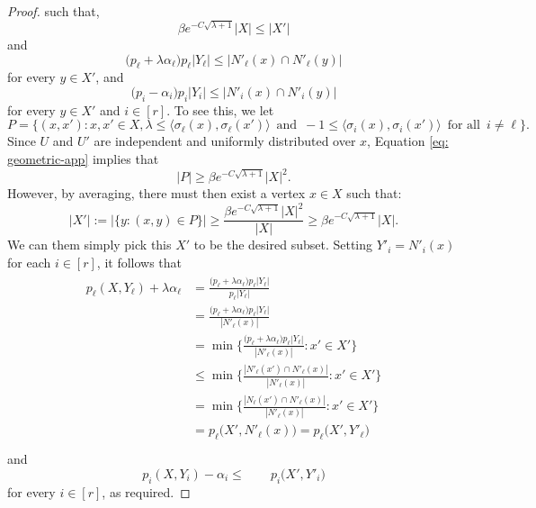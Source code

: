 \begin{proof}
  such that,
  \begin{equation*}
    \beta e^{- C \sqrt{\lambda + 1}} |X| \le |X'|
  \end{equation*}
  and
  \begin{equation*}
    \big( p_\ell + \lambda\alpha_\ell \big) p_\ell |Y_\ell | \le |N'_\ell(x) \cap N'_\ell(y)|
  \end{equation*}
  for every \(y \in X'\), and
  \begin{equation*}
    \big( p_i - \alpha_i \big) p_i |Y_i| \le |N'_i(x) \cap N'_i(y)|
  \end{equation*}
  for every \(y \in X'\) and \(i \in [r]\). To see this, we let 
  \begin{equation*}
     P= \Biggl\{(x,x'): x,x' \in X , \lambda  \le \big\langle \sigma_\ell(x),\sigma_\ell(x') \big\rangle \, \text{ and } \, -1 \le \big\langle \sigma_i(x), \sigma_i(x') \big\rangle \, \text{ for all } \, i \ne \ell  \Biggr\}.
  \end{equation*}
  Since \(U\) and \(U'\) are independent and uniformly distributed over \(x\), Equation \autoref{eq: geometric-app} implies that
  \begin{equation}
    |P|\geq \beta e^{-C\sqrt{\lambda + 1}}|X|^2.
  \end{equation} 
  However, by averaging, there must then exist a vertex \(x \in X\) such that:
  \begin{equation}
    |X'|:=\bigl|\{y: (x,y) \in P  \} \bigr| \ge \frac{\beta e^{-C\sqrt{\lambda+1}}|X|^2}{|X|}\geq  \beta e^{-C\sqrt{\lambda+1}}|X|.
  \end{equation}
  We can them simply pick this \(X'\) to be the desired subset.
  Setting \(Y'_i = N'_i(x)\) for each \(i \in [r]\), it follows that
  \begin{multline}
      \begin{aligned}
      p_\ell(X,Y_\ell) + \lambda \alpha_\ell &= \frac{ \big( p_\ell + \lambda\alpha_\ell \big) p_\ell |Y_\ell |}{p_\ell |Y_\ell|}\\
      &= \frac{ \big( p_\ell + \lambda\alpha_\ell \big) p_\ell |Y_\ell |}{| N'_\ell (x)|}\\
      &= \min\bigg\{ \frac{ \big( p_\ell + \lambda\alpha_\ell \big) p_\ell |Y_\ell |}{| N'_\ell (x)|} : x' \in X' \bigg\}\\
      &\le \min\bigg\{ \frac{|N'_\ell(x') \cap  N'_\ell (x)|}{| N'_\ell (x)|} : x' \in X' \bigg\}\\
      &= \min\bigg\{ \frac{|N_\ell(x') \cap  N'_\ell (x)|}{| N'_\ell (x)|} : x' \in X' \bigg\}\\
      &= p_\ell\big( X', N'_\ell (x) \big) = p_\ell\big( X', Y'_\ell \big) \\
    \end{aligned}
  \end{multline}
  and
  \begin{equation*}
    p_i(X,Y_i) - \alpha_i \le \qquad p_i\big( X', Y'_i \big)
  \end{equation*}
  for every \(i \in [r]\), as required.
\end{proof}